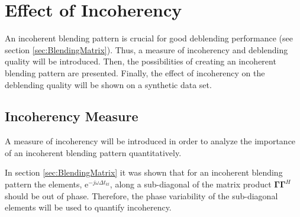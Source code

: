 \FloatBarrier

\section{Effect of Incoherency}

An incoherent blending pattern is crucial for good deblending performance (see section \ref{sec:BlendingMatrix}). Thus, a measure of incoherency and deblending quality will be introduced. Then, the possibilities of creating an incoherent blending pattern are presented. Finally, the effect of incoherency on the deblending quality will be shown on a synthetic data set.


\subsection*{Incoherency Measure}


A measure of incoherency will be introduced in order to analyze the importance of an incoherent blending pattern quantitatively.

In section \ref{sec:BlendingMatrix} it was shown that for an incoherent blending pattern the elements, $\mathrm{e}^{-j \omega \Delta t_{kl}}$, along a sub-diagonal of the matrix product $\mathbf{\Gamma \Gamma}^H$ should be out of phase. Therefore, the phase variability of the sub-diagonal elements will be used to quantify incoherency.

